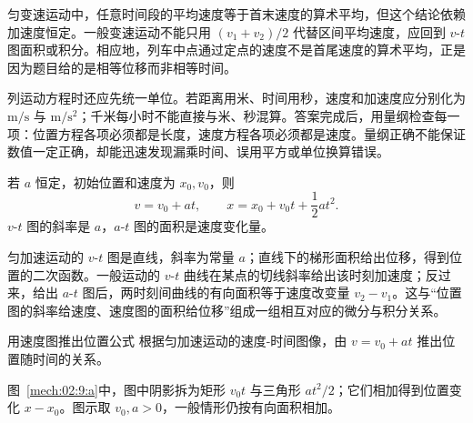 {匀变速运动中，任意时间段的平均速度等于首末速度的算术平均，但这个结论依赖加速度恒定。一般变速运动不能只用 $(v_1+v_2)/2$ 代替区间平均速度，应回到 $v$-$t$ 图面积或积分。相应地，列车中点通过定点的速度不是首尾速度的算术平均，正是因为题目给的是相等位移而非相等时间。

列运动方程时还应先统一单位。若距离用米、时间用秒，速度和加速度应分别化为 $\mathrm{m/s}$ 与 $\mathrm{m/s^2}$；千米每小时不能直接与米、秒混算。答案完成后，用量纲检查每一项：位置方程各项必须都是长度，速度方程各项必须都是速度。量纲正确不能保证数值一定正确，却能迅速发现漏乘时间、误用平方或单位换算错误。

若 $a$ 恒定，初始位置和速度为 $x_0,v_0$，则
\begin{equation}
  v=v_0+at,\qquad
  x=x_0+v_0t+\frac12at^2.
\end{equation}
$v$-$t$ 图的斜率是 $a$，$a$-$t$ 图的面积是速度变化量。

匀加速运动的 $v$-$t$ 图是直线，斜率为常量 $a$；直线下的梯形面积给出位移，得到位置的二次函数。一般运动的 $v$-$t$ 曲线在某点的切线斜率给出该时刻加速度；反过来，给出 $a$-$t$ 图后，两时刻间曲线的有向面积等于速度改变量 $v_2-v_1$。这与“位置图的斜率给速度、速度图的面积给位移”组成一组相互对应的微分与积分关系。

\begin{origexamplebox}{用速度图推出位置公式}\label{ch02:ex:k02-2-9}
根据匀加速运动的速度-时间图像，由 $v=v_0+at$ 推出位置随时间的关系。

\begin{qualityfigure}
\label{mech:02:9:q}
\end{qualityfigure}
\end{origexamplebox}
\begin{xesolution}
\begin{qualityfigure}
\label{mech:02:9:a}
\end{qualityfigure}
图~\ref{mech:02:9:a}中，图中阴影拆为矩形 $v_0t$ 与三角形 $at^2/2$；它们相加得到位置变化 $x-x_0$。图示取 $v_0,a>0$，一般情形仍按有向面积相加。


\end{xesolution}}
